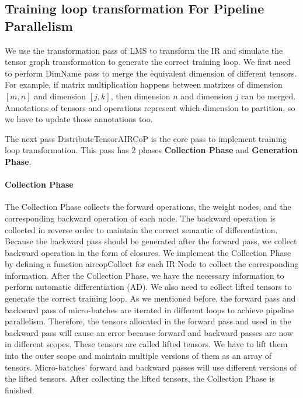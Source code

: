\documentclass[sigplan, nonacm]{acmart}\settopmatter{printfolios=true,printccs=false,printacmref=false}
\begin{document}
\subsection{Training loop transformation For Pipeline Parallelism}
We use the transformation pass of LMS to transform the IR and simulate the tensor graph transformation to generate the correct training loop. We first need to perform DimName pass to merge the equivalent dimension of different tensors. For example, if matrix multiplication happens between matrixes of dimension $[m, n]$ and dimension $[j,k]$, then dimension $n$ and dimension $j$ can be merged.  Annotations of tensors and operations represent which dimension to partition, so we have to update those annotations too. \par
The next pass DistributeTensorAIRCoP is the core pass to implement training loop transformation. This pass has 2 phases \textbf{Collection Phase} and \textbf{Generation Phase}.\par
\paragraph{Collection Phase}
The Collection Phase collects the forward operations, the weight nodes, and the corresponding backward operation of each node. The backward operation is collected in reverse order to maintain the correct semantic of differentiation. Because the backward pass should be generated after the forward pass, we collect backward operation in the form of closures. We implement the Collection Phase by defining a function aircopCollect for each IR Node to collect the corresponding information. After the Collection Phase, we have the necessary information to perform automatic differentiation (AD). We also need to collect lifted tensors to generate the correct training loop. As we mentioned before, the forward pass and backward pass of micro-batches are iterated in different loops to achieve pipeline parallelism. Therefore, the tensors allocated in the forward pass and used in the backward pass will cause an error because forward and backward passes are now in different scopes. These tensors are called lifted tensors. We have to lift them into the outer scope and maintain multiple versions of them as an array of tensors. Micro-batches' forward and backward passes will use different versions of the lifted tensors. After collecting the lifted tensors, the Collection Phase is finished.\par
\end{document}
